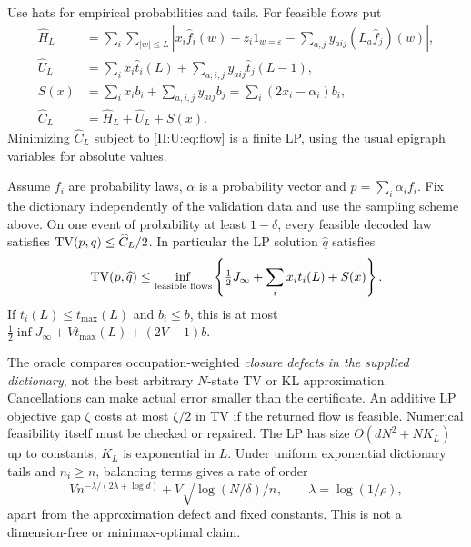 Use hats for empirical probabilities and tails. For feasible flows put
\begin{align*}
 \widehat H_L&=\sum_i\sum_{|w|\le L}
  \left|x_i\widehat f_i(w)-z_i1_{w=\varepsilon}
             -\sum_{a,j}y_{aij}(L_a\widehat f_j)(w)\right|,\\
 \widehat U_L&=\sum_i x_i\widehat t_i(L)
                 +\sum_{a,i,j}y_{aij}\widehat t_j(L-1),\\
 S(x)&=\sum_i x_ib_i+\sum_{a,i,j}y_{aij}b_j
       =\sum_i(2x_i-\alpha_i)b_i,\\
 \widehat C_L&=\widehat H_L+\widehat U_L+S(x).
\end{align*}
Minimizing $\widehat C_L$ subject to \eqref{II:U:eq:flow} is a finite LP,
using the usual epigraph variables for absolute values.

\begin{theorem}\label{II:U:thm:flow-lp}
Assume $f_i$ are probability laws, $\alpha$ is a probability vector and $p=\sum_i\alpha_i f_i$. Fix the dictionary independently of the validation data and use the sampling scheme above. On one event of probability at least $1-\delta$, every feasible decoded
law satisfies $\operatorname{TV}(p,q)\le\widehat C_L/2$. In particular the LP
solution $\widehat q$ satisfies
\[
 \operatorname{TV}(p,\widehat q)\le
 \inf_{\text{feasible flows}}\left\{\tfrac12J_\infty
                     +\sum_i x_it_i(L)+S(x)\right\}.
\]
If $t_i(L)\le t_{\max}(L)$ and $b_i\le b$, this is at most
$\tfrac12\inf J_\infty+Vt_{\max}(L)+(2V-1)b$.
\end{theorem}


The oracle compares occupation-weighted \emph{closure defects in the supplied
dictionary}, not the best arbitrary $N$-state TV or KL approximation.
Cancellations can make actual error smaller than the certificate. An
additive LP objective gap $\zeta$ costs at most $\zeta/2$ in TV if the
returned flow is feasible. Numerical feasibility itself must be checked or
repaired. The LP has size $O(dN^2+NK_L)$ up to constants; $K_L$ is
exponential in $L$. Under uniform exponential dictionary tails and
$n_i\ge n$, balancing terms gives a rate of order
\[
 Vn^{-\lambda/(2\lambda+\log d)}
       +V\sqrt{\log(N/\delta)/n},\qquad\lambda=\log(1/\rho),
\]
apart from the approximation defect and fixed constants. This is not a
dimension-free or minimax-optimal claim.

